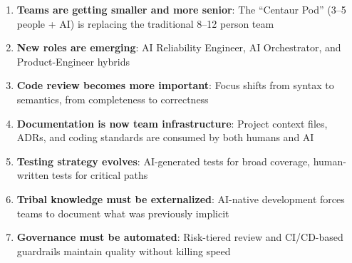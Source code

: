 \begin{enumerate}[leftmargin=*]
    \item \textbf{Teams are getting smaller and more senior}: The ``Centaur Pod'' (3--5 people + AI) is replacing the traditional 8--12 person team
    \item \textbf{New roles are emerging}: AI Reliability Engineer, AI Orchestrator, and Product-Engineer hybrids
    \item \textbf{Code review becomes more important}: Focus shifts from syntax to semantics, from completeness to correctness
    \item \textbf{Documentation is now team infrastructure}: Project context files, ADRs, and coding standards are consumed by both humans and AI
    \item \textbf{Testing strategy evolves}: AI-generated tests for broad coverage, human-written tests for critical paths
    \item \textbf{Tribal knowledge must be externalized}: AI-native development forces teams to document what was previously implicit
    \item \textbf{Governance must be automated}: Risk-tiered review and CI/CD-based guardrails maintain quality without killing speed
\end{enumerate}
